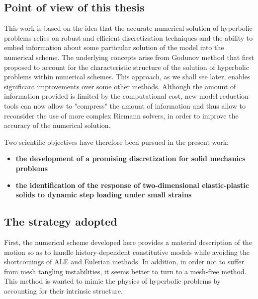 \subsection{Point of view of this thesis}

This work is based on the idea that the accurate numerical solution of hyperbolic problems relies on robust and efficient discretization techniques and the ability to embed information about some particular solution of the model into the numerical scheme.
The underlying concepts arise from Godunov method \cite{Godunov_method} that first proposed to account for the characteristic structure of the solution of hyperbolic problems within numerical schemes.
This approach, as we shall see later, enables significant improvements over some other methods.
Although the amount of information provided is limited by the computational cost, new model reduction tools can now allow to "compress" the amount of information and thus allow to reconsider the use of more complex Riemann solvers, in order to improve the accuracy of the numerical solution.

Two scientific objectives have therefore been pursued in the present work:
\begin{itemize}
\item \textbf{the development of a promising discretization for solid mechanics problems}
\item \textbf{the identification of the response of two-dimensional elastic-plastic solids to dynamic step loading under small strains}
\end{itemize}

\subsection{The strategy adopted}
First, the numerical scheme developed here provides a material description of the motion so as to handle history-dependent constitutive models while avoiding the shortcomings of ALE and Eulerian methods.
In addition, in order not to suffer from mesh tangling instabilities, it seems better to turn to a mesh-free method.
This method is wanted to mimic the physics of hyperbolic problems by accounting for their intrinsic structure.

